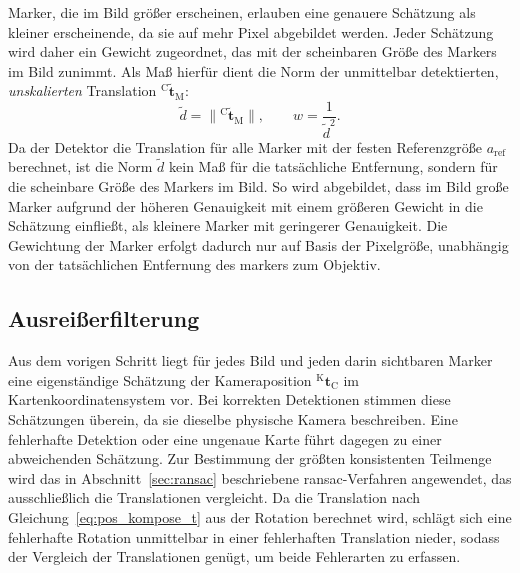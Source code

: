 Marker, die im Bild größer erscheinen, erlauben eine genauere Schätzung als kleiner erscheinende, da sie auf mehr Pixel abgebildet werden.
Jeder Schätzung wird daher ein Gewicht zugeordnet, das mit der scheinbaren Größe des Markers im Bild zunimmt.
Als Maß hierfür dient die Norm der unmittelbar detektierten, \emph{unskalierten} Translation $^{\mathrm{C}}\tilde{\mathbf{t}}_{\mathrm{M}}$:
\begin{equation}
\tilde{d} = \lVert{^{\mathrm{C}}\tilde{\mathbf{t}}_{\mathrm{M}}}\rVert, \qquad w = \frac{1}{\tilde{d}^{2}}.
\label{eq:pos_gewicht}
\end{equation}
Da der Detektor die Translation für alle Marker mit der festen Referenzgröße $a_{\mathrm{ref}}$ berechnet, 
ist die Norm $\tilde{d}$ kein Maß für die tatsächliche Entfernung, sondern für die scheinbare Größe des Markers im Bild.
So wird abgebildet, dass im Bild große Marker aufgrund der höheren Genauigkeit mit einem größeren Gewicht in die Schätzung einfließt, 
als kleinere Marker mit geringerer Genauigkeit.
Die Gewichtung der Marker erfolgt dadurch nur auf Basis der Pixelgröße, unabhängig von der tatsächlichen Entfernung des markers zum Objektiv.



\subsection{Ausreißerfilterung}
\label{subsec:pos_ausreisserfilterung}
Aus dem vorigen Schritt liegt für jedes Bild und jeden darin sichtbaren Marker eine eigenständige Schätzung
der Kameraposition $^{\mathrm{K}}\mathbf{t}_{\mathrm{C}}$ im Kartenkoordinatensystem vor.
Bei korrekten Detektionen stimmen diese Schätzungen überein, da sie dieselbe physische Kamera beschreiben.
Eine fehlerhafte Detektion oder eine ungenaue Karte führt dagegen zu einer abweichenden Schätzung.
Zur Bestimmung der größten konsistenten Teilmenge wird das in Abschnitt~\ref{sec:ransac} beschriebene \gls{ransac}-Verfahren angewendet,
das ausschließlich die Translationen vergleicht.
Da die Translation nach Gleichung~\eqref{eq:pos_kompose_t} aus der Rotation berechnet wird, schlägt sich eine fehlerhafte Rotation
unmittelbar in einer fehlerhaften Translation nieder, sodass der Vergleich der Translationen genügt, um beide Fehlerarten zu erfassen.

